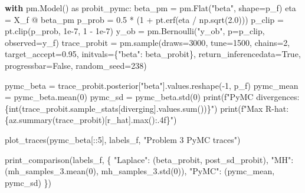 \documentclass[
  letterpaper,
  DIV=11,
  numbers=noendperiod]{scrartcl}
\newenvironment{Shaded}{\begin{snugshade}}{\end{snugshade}}
\newcommand{\BuiltInTok}[1]{\textcolor[rgb]{0.00,0.23,0.31}{#1}}
\newcommand{\ControlFlowTok}[1]{\textcolor[rgb]{0.00,0.23,0.31}{\textbf{#1}}}
\newcommand{\DecValTok}[1]{\textcolor[rgb]{0.68,0.00,0.00}{#1}}
\newcommand{\FloatTok}[1]{\textcolor[rgb]{0.68,0.00,0.00}{#1}}
\newcommand{\ImportTok}[1]{\textcolor[rgb]{0.00,0.46,0.62}{#1}}
\newcommand{\NormalTok}[1]{\textcolor[rgb]{0.00,0.23,0.31}{#1}}
\newcommand{\OperatorTok}[1]{\textcolor[rgb]{0.37,0.37,0.37}{#1}}
\newcommand{\SpecialCharTok}[1]{\textcolor[rgb]{0.37,0.37,0.37}{#1}}
\newcommand{\SpecialStringTok}[1]{\textcolor[rgb]{0.13,0.47,0.30}{#1}}
\newcommand{\StringTok}[1]{\textcolor[rgb]{0.13,0.47,0.30}{#1}}
\newcommand{\VariableTok}[1]{\textcolor[rgb]{0.07,0.07,0.07}{#1}}
\begin{document}
\begin{Shaded}
\begin{Highlighting}[]
\ControlFlowTok{with}\NormalTok{ pm.Model() }\ImportTok{as}\NormalTok{ probit\_pymc:}
\NormalTok{    beta\_pm }\OperatorTok{=}\NormalTok{ pm.Flat(}\StringTok{"beta"}\NormalTok{, shape}\OperatorTok{=}\NormalTok{p\_f)}
\NormalTok{    eta }\OperatorTok{=}\NormalTok{ X\_f }\OperatorTok{@}\NormalTok{ beta\_pm}
\NormalTok{    p\_prob }\OperatorTok{=} \FloatTok{0.5} \OperatorTok{*}\NormalTok{ (}\DecValTok{1} \OperatorTok{+}\NormalTok{ pt.erf(eta }\OperatorTok{/}\NormalTok{ np.sqrt(}\FloatTok{2.0}\NormalTok{)))}
\NormalTok{    p\_clip }\OperatorTok{=}\NormalTok{ pt.clip(p\_prob, }\FloatTok{1e{-}7}\NormalTok{, }\DecValTok{1} \OperatorTok{{-}} \FloatTok{1e{-}7}\NormalTok{)}
\NormalTok{    y\_ob }\OperatorTok{=}\NormalTok{ pm.Bernoulli(}\StringTok{"y\_ob"}\NormalTok{, p}\OperatorTok{=}\NormalTok{p\_clip, observed}\OperatorTok{=}\NormalTok{y\_f)}
\NormalTok{    trace\_probit }\OperatorTok{=}\NormalTok{ pm.sample(draws}\OperatorTok{=}\DecValTok{3000}\NormalTok{, tune}\OperatorTok{=}\DecValTok{1500}\NormalTok{, chains}\OperatorTok{=}\DecValTok{2}\NormalTok{,}
\NormalTok{                             target\_accept}\OperatorTok{=}\FloatTok{0.95}\NormalTok{,}
\NormalTok{                             initvals}\OperatorTok{=}\NormalTok{\{}\StringTok{"beta"}\NormalTok{: beta\_probit\},}
\NormalTok{                             return\_inferencedata}\OperatorTok{=}\VariableTok{True}\NormalTok{,}
\NormalTok{                             progressbar}\OperatorTok{=}\VariableTok{False}\NormalTok{, random\_seed}\OperatorTok{=}\DecValTok{238}\NormalTok{)}

\NormalTok{pymc\_beta }\OperatorTok{=}\NormalTok{ trace\_probit.posterior[}\StringTok{"beta"}\NormalTok{].values.reshape(}\OperatorTok{{-}}\DecValTok{1}\NormalTok{, p\_f)}
\NormalTok{pymc\_mean }\OperatorTok{=}\NormalTok{ pymc\_beta.mean(}\DecValTok{0}\NormalTok{)}
\NormalTok{pymc\_sd   }\OperatorTok{=}\NormalTok{ pymc\_beta.std(}\DecValTok{0}\NormalTok{)}
\BuiltInTok{print}\NormalTok{(}\SpecialStringTok{f"PyMC divergences: }\SpecialCharTok{\{}\BuiltInTok{int}\NormalTok{(trace\_probit.sample\_stats[}\StringTok{\textquotesingle{}diverging\textquotesingle{}}\NormalTok{].values.}\BuiltInTok{sum}\NormalTok{())}\SpecialCharTok{\}}\SpecialStringTok{"}\NormalTok{)}
\BuiltInTok{print}\NormalTok{(}\SpecialStringTok{f"Max R{-}hat: }\SpecialCharTok{\{}\NormalTok{az}\SpecialCharTok{.}\NormalTok{summary(trace\_probit)[}\StringTok{\textquotesingle{}r\_hat\textquotesingle{}}\NormalTok{]}\SpecialCharTok{.}\BuiltInTok{max}\NormalTok{()}\SpecialCharTok{:.4f\}}\SpecialStringTok{"}\NormalTok{)}

\NormalTok{plot\_traces(pymc\_beta[::}\DecValTok{5}\NormalTok{], labels\_f, }\StringTok{"Problem 3 PyMC traces"}\NormalTok{)}

\NormalTok{print\_comparison(labels\_f, \{}
    \StringTok{"Laplace"}\NormalTok{: (beta\_probit, post\_sd\_probit),}
    \StringTok{"MH"}\NormalTok{:      (mh\_samples\_3.mean(}\DecValTok{0}\NormalTok{), mh\_samples\_3.std(}\DecValTok{0}\NormalTok{)),}
    \StringTok{"PyMC"}\NormalTok{:    (pymc\_mean, pymc\_sd)}
\NormalTok{\})}
\end{Highlighting}
\end{Shaded}
\end{document}
